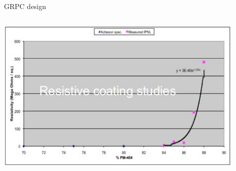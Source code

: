 \documentclass[10pt]{beamer}
\begin{document}
\begin{frame}{GRPC design}
\begin{columns}
\begin{column}{0.45\textwidth}
       \centerline{\includegraphics[width=0.9\textwidth]{jpg/CoatingStudies}}
      \end{column}
    \end{columns}
  

\end{frame}
\end{document}
